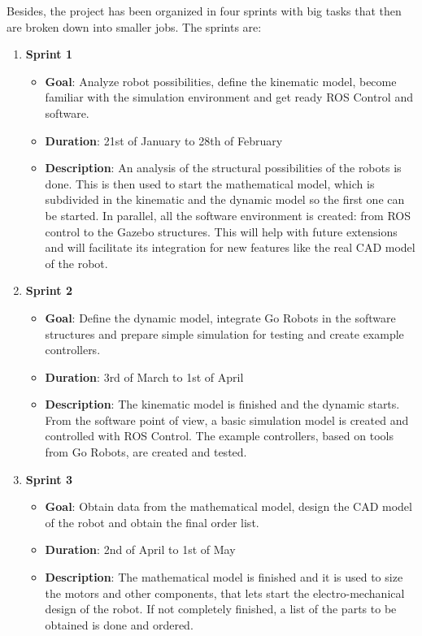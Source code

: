 Besides, the project has been organized in four sprints with big tasks that then are broken down into smaller jobs. The sprints are:
\begin{enumerate}
  \item \textbf{Sprint 1}
    \begin{itemize}
      \item \textbf{Goal}: Analyze robot possibilities, define the kinematic model, become familiar with the simulation environment and get ready ROS Control and software.
      \item \textbf{Duration}: 21st of January to 28th of February
      \item \textbf{Description}: An analysis of the structural possibilities of the robots is done. This is then used to start the mathematical model, which is subdivided in the kinematic and the dynamic model so the first one can be started. In parallel, all the software environment is created: from ROS control to the Gazebo structures. This will help with future extensions and will facilitate its integration for new features like the real CAD model of the robot.
    \end{itemize}
    \item \textbf{Sprint 2}
    \begin{itemize}
      \item \textbf{Goal}: Define the dynamic model, integrate Go Robots in the software structures and prepare simple simulation for testing and create example controllers.
      \item \textbf{Duration}: 3rd of March to 1st of April
      \item \textbf{Description}: The kinematic model is finished and the dynamic starts. From the software point of view, a basic simulation model is created and controlled with ROS Control. The example controllers, based on tools from Go Robots, are created and tested.
    \end{itemize}
  \item \textbf{Sprint 3}
    \begin{itemize}
      \item \textbf{Goal}: Obtain data from the mathematical model, design the CAD model of the robot and obtain the final order list.
      \item \textbf{Duration}: 2nd of April to 1st of May
      \item \textbf{Description}: The mathematical model is finished and it is used to size the motors and other components, that lets start the electro-mechanical design of the robot. If not completely finished, a list of the parts to be obtained is done and ordered.

\end{itemize}
\end{enumerate}

